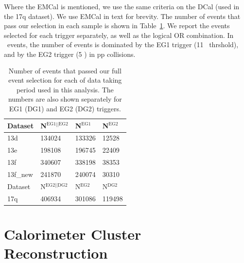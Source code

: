 Where the EMCal is mentioned, we use the same criteria on the DCal (used in the 17q dataset). We use EMCal in text for brevity.
The number of events that pass our selection in each sample is shown in Table~\ref{tab:eventsselected}. We report the events selected for each trigger separately, as well as the logical OR combination. In \pPb~events, the number of events is dominated by the EG1 trigger (11 \GeVc~thrshold), and by the EG2 trigger (5 \GeVc) in pp collisions. 

\begin{table}[h]
   \centering
   \caption{Number of events that passed our full event selection for each of data taking period used in this analysis. The numbers are also shown separately for EG1 (DG1) and EG2 (DG2) triggers.}
   \label{tab:eventsselected}
   \begin{tabular*}{1.0\columnwidth}{@{\extracolsep{\fill}}llll@{}}
    \hline
    Dataset &  	N$^{\mathrm{EG1||EG2}}$ &	N$^{\mathrm{EG1}}$ & N$^{\mathrm{EG2}}$\\
    \hline
    13d &	134024 & 133326 & 12528\\
    13e &	198108 & 196745 & 22409\\
    13f &   340607 & 338198 & 38353\\
    13f\_new & 241870 & 240074 & 30310\\
    \hline
    Dataset &	N$^{\mathrm{EG2 || DG2}}$ &		N$^{\mathrm{EG2}}$ & N$^{\mathrm{DG2}}$\\
    \hline

    17q & 406934 & 301086 & 119498 \\
 
    \hline
   \end{tabular*}
\end{table}

\section{Calorimeter Cluster Reconstruction}
\label{sec:clusterselection}
